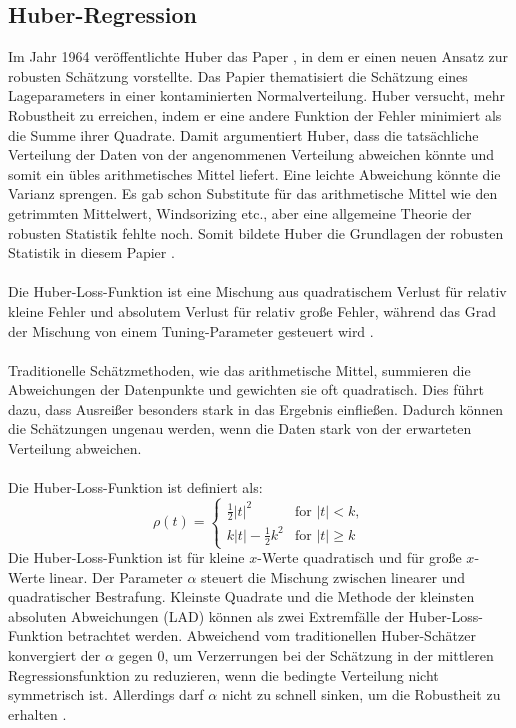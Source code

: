\subsection{Huber-Regression}
\label{huberregression}
Im Jahr 1964 veröffentlichte Huber das Paper , in dem er einen neuen Ansatz zur robusten Schätzung vorstellte. Das Papier thematisiert die Schätzung eines Lageparameters in einer kontaminierten Normalverteilung. Huber versucht, mehr Robustheit zu erreichen, indem er eine andere Funktion der Fehler minimiert als die Summe ihrer Quadrate. Damit argumentiert Huber, dass die tatsächliche Verteilung der Daten von der angenommenen Verteilung abweichen könnte und somit ein übles arithmetisches Mittel liefert. Eine leichte Abweichung könnte die Varianz sprengen. Es gab schon Substitute für das arithmetische Mittel wie den getrimmten Mittelwert, Windsorizing etc., aber eine allgemeine Theorie der robusten Statistik fehlte noch. Somit bildete Huber die Grundlagen der robusten Statistik in diesem Papier \cite{huberpapier}. \\\\
Die Huber-Loss-Funktion ist eine Mischung aus quadratischem Verlust für relativ kleine Fehler und absolutem Verlust für relativ große Fehler, während das Grad der Mischung von einem Tuning-Parameter gesteuert wird \cite{indirekthuber}. 
\\\\
Traditionelle Schätzmethoden, wie das arithmetische Mittel, summieren die Abweichungen der Datenpunkte und gewichten sie oft quadratisch. Dies führt dazu, dass Ausreißer besonders stark in das Ergebnis einfließen. Dadurch können die Schätzungen ungenau werden, wenn die Daten stark von der erwarteten Verteilung abweichen.    \\\\
Die Huber-Loss-Funktion ist definiert als:
\begin{equation}
\rho(t) = 
\begin{cases} 
  \frac{1}{2} |t|^2 & \text{for } |t| < k, \\ 
  k |t| - \frac{1}{2} k^2 & \text{for } |t| \geq k 
\end{cases}
\label{eq:huber}
\end{equation}
Die Huber-Loss-Funktion ist für kleine \(x\)-Werte quadratisch und für große \(x\)-Werte linear. Der Parameter $\alpha$ steuert die Mischung zwischen linearer und quadratischer Bestrafung. Kleinste Quadrate und die Methode der kleinsten absoluten Abweichungen (\ac{LAD}) können als zwei Extremfälle der Huber-Loss-Funktion betrachtet werden. Abweichend vom traditionellen Huber-Schätzer konvergiert der $\alpha$ gegen 0, um Verzerrungen bei der Schätzung in der mittleren Regressionsfunktion zu reduzieren, wenn die bedingte Verteilung nicht symmetrisch ist. Allerdings darf $\alpha$ nicht zu schnell sinken, um die Robustheit zu erhalten \cite{indirekthuber}.   
 